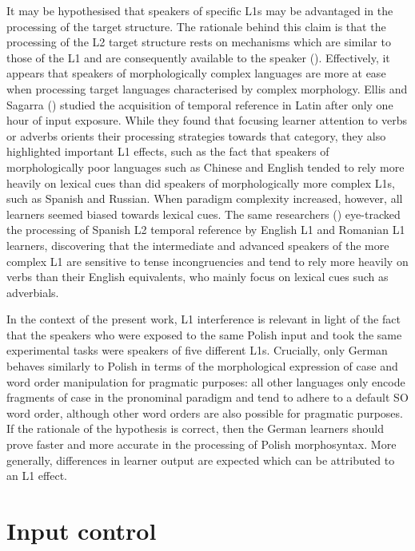 It may be hypothesised that speakers of specific L1s may be advantaged in the processing of the target structure. The rationale behind this claim is that the processing of the L2 target structure rests on mechanisms which are similar to those of the L1 and are consequently available to the speaker (\citealt{TokowiczMacWhinney2005, Ellis2006a}). Effectively, it appears that speakers of morphologically complex languages are more at ease when processing target languages characterised by complex morphology. Ellis and Sagarra (\citeyear{EllisSagarra2010a, EllisSagarra2011}) studied the acquisition of temporal reference in Latin after only one hour of input exposure. While they found that focusing learner attention to verbs or adverbs orients their processing strategies towards that category, they also highlighted important L1 effects, such as the fact that speakers of morphologically poor languages such as Chinese and English tended to rely more heavily on lexical cues than did speakers of morphologically more complex L1s, such as Spanish and Russian. When paradigm complexity increased, however, all learners seemed biased towards lexical cues. The same researchers (\citealt{SagarraEllis2013, Sagarra2014}) eye-tracked the processing of Spanish L2 temporal reference by English L1 and Romanian L1 learners, discovering that the intermediate and advanced speakers of the more complex L1 are sensitive to tense incongruencies and tend to rely more heavily on verbs than their English equivalents, who mainly focus on lexical cues such as adverbials.

In the context of the present work, L1 interference is relevant in light of the fact that the speakers who were exposed to the same Polish input and took the same experimental tasks were speakers of five different L1s. Crucially, only German behaves similarly to Polish in terms of the morphological expression of case and word order manipulation for pragmatic purposes: all other languages only encode fragments of case in the pronominal paradigm and tend to adhere to a default SO word order, although other word orders are also possible for pragmatic purposes. If the rationale of the hypothesis is correct, then the German learners should prove faster and more accurate in the processing of Polish morphosyntax. More generally, differences in learner output are expected which can be attributed to an L1 effect.

\section{Input control}\label{sec:01:4}

